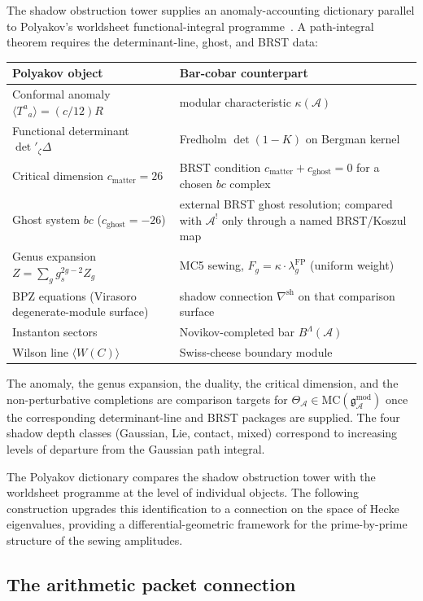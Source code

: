 \documentclass[11pt]{report}
\theoremstyle{definition}
\theoremstyle{remark}
\providecommand{\cA}{\mathcal{A}}
\providecommand{\gAmod}{\mathfrak{g}^{\mathrm{mod}}_\cA}
\numberwithin{equation}{section}
\begin{document}
The shadow obstruction tower supplies an anomaly-accounting dictionary
parallel to Polyakov's worldsheet functional-integral
programme~\cite{Pol87}.  A path-integral theorem requires the
determinant-line, ghost, and BRST data:
\begin{center}
\small
\renewcommand{\arraystretch}{1.15}
\begin{tabular}{ll}
\textbf{Polyakov object}
 & \textbf{Bar-cobar counterpart} \\ \hline
Conformal anomaly $\langle T^a{}_a\rangle=(c/12)R$
 & modular characteristic $\kappa(\cA)$ \\[2pt]
Functional determinant $\det'_\zeta\Delta$
 & Fredholm $\det(1-K)$ on Bergman kernel \\[2pt]
Critical dimension $c_{\mathrm{matter}}=26$
 & BRST condition $c_{\mathrm{matter}}+c_{\mathrm{ghost}}=0$ for a chosen
 $bc$ complex \\[2pt]
Ghost system $bc$ ($c_{\mathrm{ghost}}=-26$)
 & external BRST ghost resolution; compared with $\cA^!$ only through a
 named BRST/Koszul map \\[2pt]
Genus expansion $Z=\sum_g g_s^{2g-2}Z_g$
 & MC5 sewing, $F_g=\kappa\cdot\lambda_g^{\mathrm{FP}}$ (uniform weight) \\[2pt]
BPZ equations (Virasoro degenerate-module surface)
 & shadow connection $\nabla^{\mathrm{sh}}$ on that comparison surface \\[2pt]
Instanton sectors
 & Novikov-completed bar $B^\Lambda(\cA)$ \\[2pt]
Wilson line $\langle W(C)\rangle$
 & Swiss-cheese boundary module
\end{tabular}
\end{center}
The anomaly, the genus expansion, the duality, the critical
dimension, and the non-perturbative completions are comparison targets
for $\Theta_\cA\in\mathrm{MC}(\gAmod)$ once the corresponding
determinant-line and BRST packages are supplied. The four shadow depth
classes (Gaussian, Lie, contact, mixed) correspond to increasing
levels of departure from the Gaussian path integral.

The Polyakov dictionary compares the shadow obstruction tower with the
worldsheet programme at the level of individual objects. The
following construction upgrades this identification to a connection
on the space of Hecke eigenvalues, providing a differential-geometric
framework for the prime-by-prime structure of the sewing amplitudes.

\subsection*{The arithmetic packet connection}
\end{document}
